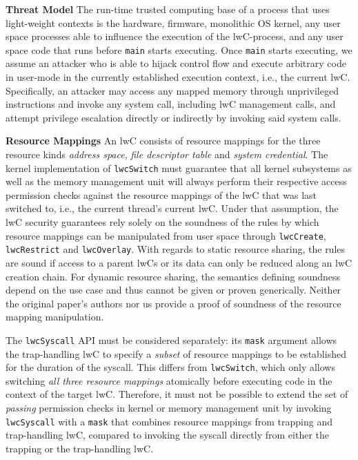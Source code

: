 \documentclass[10pt,twocolumn,a4paper]{article}
\begin{document}
\textbf{Threat Model}\hspace{1em}
The run-time trusted computing base of a process that uses light-weight contexts is the
hardware,
firmware,
monolithic OS kernel,
any user space processes able to influence the execution of the lwC-process,
and any user space code that runs before \lstinline{main} starts executing.
Once \lstinline{main} starts executing, we assume an attacker who is able to hijack control flow and execute arbitrary code in user-mode in the currently established execution context, i.e., the current lwC.
Specifically, an attacker may access any mapped memory through unprivileged instructions and invoke any system call, including lwC management calls, and attempt privilege escalation directly or indirectly by invoking said system calls.
\cite{lwcpaper}

\textbf{Resource Mappings}\hspace{1em}
An lwC consists of resource mappings for the three resource kinds \textit{address space}, \textit{file descriptor table} and \textit{system credential}.
The kernel implementation of \texttt{lwcSwitch} must guarantee that all kernel subsystems as well as the memory management unit will always perform their respective access permission checks against the resource mappings of the lwC that was last switched to, i.e., the current thread's current lwC.
Under that assumption, the lwC security guarantees rely solely on the soundness of the rules by which resource mappings can be manipulated from user space through \lstinline{lwcCreate}, \lstinline{lwcRestrict} and \lstinline{lwcOverlay}.
With regards to static resource sharing, the rules are sound if access to a parent lwCs or its data can only be reduced along an lwC creation chain.
For dynamic resource sharing, the semantics defining soundness depend on the use case and thus cannot be given or proven generically.
Neither the original paper's authors nor us provide a proof of soundness of the resource mapping manipulation.

The \lstinline{lwcSyscall} API must be considered separately:
its \lstinline{mask} argument allows the trap-handling lwC to specify a \textit{subset} of resource mappings to be established for the duration of the syscall.
This differs from \lstinline{lwcSwitch}, which only allows switching \textit{all three resource mappings} atomically before executing code in the context of the target lwC.
Therefore, it must not be possible to extend the set of \textit{passing} permission checks in kernel or memory management unit by invoking \lstinline{lwcSyscall} with a \lstinline{mask} that combines resource mappings from trapping and trap-handling lwC, compared to invoking the syscall directly from either the trapping or the trap-handling lwC.
\end{document}
